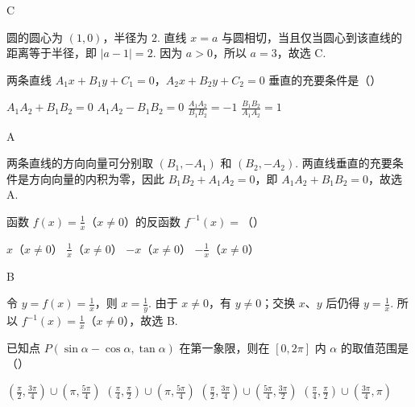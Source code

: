 \documentclass[UTF8,a4paper,oneside,11pt]{ctexbook}
\begin{document}
\begin{answer}
C
\end{answer}

\begin{solution}
圆的圆心为 \((1,0)\)，半径为 \(2\). 直线 \(x=a\) 与圆相切，当且仅当圆心到该直线的距离等于半径，即 \(|a-1|=2\). 因为 \(a>0\)，所以 \(a=3\)，故选 C.
\end{solution}

\begin{problem}
两条直线 \(A_{1}x + B_{1}y + C_{1} = 0\)，\(A_{2}x + B_{2}y + C_{2} = 0\) 垂直的充要条件是（\quad）

\choices
    {\(A_{1}A_{2} + B_{1}B_{2} = 0\)}
    {\(A_{1}A_{2} - B_{1}B_{2} = 0\)}
    {\(\frac{A_1A_2}{B_1B_2} = -1\)}
    {\(\frac{B_1B_2}{A_1A_2} = 1\)}
\end{problem}

\begin{answer}
A
\end{answer}

\begin{solution}
两条直线的方向向量可分别取 \((B_{1},-A_{1})\) 和 \((B_{2},-A_{2})\). 两直线垂直的充要条件是方向向量的内积为零，因此
\(B_{1}B_{2}+A_{1}A_{2}=0\)，即 \(A_{1}A_{2}+B_{1}B_{2}=0\)，故选 A.
\end{solution}

\begin{problem}
函数 \(f(x)=\frac{1}{x}\)（\(x\neq 0\)）的反函数 \(f^{-1}(x)=\)（\quad）

\choices
    {\(x\)（\(x\neq 0\)）}
    {\(\frac{1}{x}\)（\(x\neq 0\)）}
    {\(-x\)（\(x\neq 0\)）}
    {\(-\frac{1}{x}\)（\(x\neq 0\)）}
\end{problem}

\begin{answer}
B
\end{answer}

\begin{solution}
令 \(y=f(x)=\frac{1}{x}\)，则 \(x=\frac{1}{y}\). 由于 \(x\neq0\)，有 \(y\neq0\)；交换 \(x\)、\(y\) 后仍得 \(y=\frac{1}{x}\). 所以 \(f^{-1}(x)=\frac{1}{x}\)（\(x\neq0\)），故选 B.
\end{solution}

\begin{problem}
已知点 \(P(\sin \alpha - \cos \alpha, \tan \alpha)\) 在第一象限，则在 \([0, 2\pi]\) 内 \(\alpha\) 的取值范围是（\quad）

\choices
    {\(\left(\frac{\pi}{2}, \frac{3\pi}{4}\right) \cup \left(\pi, \frac{5\pi}{4}\right)\)}
    {\(\left(\frac{\pi}{4}, \frac{\pi}{2}\right) \cup \left(\pi, \frac{5\pi}{4}\right)\)}
    {\(\left(\frac{\pi}{2}, \frac{3\pi}{4}\right) \cup \left(\frac{5\pi}{4}, \frac{3\pi}{2}\right)\)}
    {\(\left(\frac{\pi}{4}, \frac{\pi}{2}\right) \cup \left(\frac{3\pi}{4}, \pi\right)\)}
\end{problem}
\end{document}
